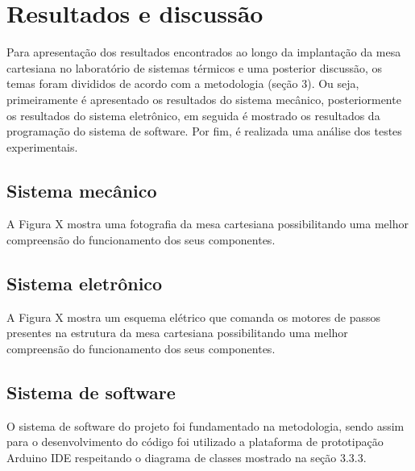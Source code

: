 \chapter{Resultados e discussão}
\label{chap:resultados}

Para apresentação dos resultados encontrados ao longo da implantação da mesa cartesiana no 
laboratório de sistemas térmicos e uma posterior discussão, os temas foram divididos de acordo 
com a metodologia (seção 3). Ou seja, primeiramente é apresentado os resultados do sistema mecânico, 
posteriormente os resultados do sistema eletrônico, em seguida é mostrado os resultados da programação 
do sistema de software. Por fim, é realizada uma análise dos testes experimentais.

\section{Sistema mecânico}

A Figura X mostra uma fotografia da mesa cartesiana possibilitando uma melhor compreensão do funcionamento 
dos seus componentes.

%
%

\section{Sistema eletrônico}

A Figura X mostra um esquema elétrico que comanda os motores de passos presentes na estrutura  da mesa 
cartesiana possibilitando uma melhor compreensão do funcionamento dos seus componentes.

%
%


\section{Sistema de software}

O sistema de software do projeto foi fundamentado na metodologia, sendo assim para o desenvolvimento do código 
foi utilizado a plataforma de prototipação Arduino IDE respeitando o diagrama de classes mostrado na seção 3.3.3.



